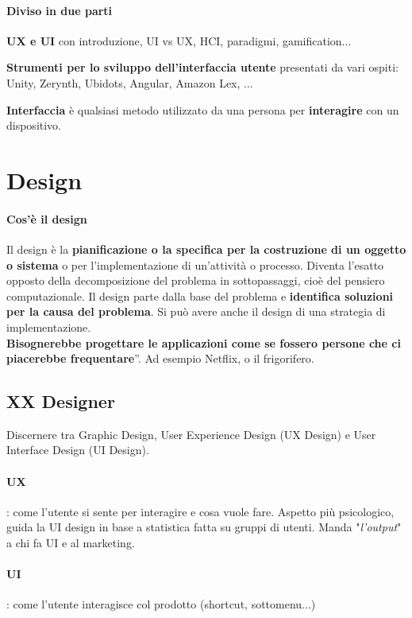 \documentclass[10pt]{article}
\begin{document}
\paragraph{Diviso in due parti}
\begin{list}{-}{}
\item \textbf{UX e UI} con introduzione, UI vs UX, HCI, paradigmi, gamification...
\item \textbf{Strumenti per lo sviluppo dell'interfaccia utente} presentati da vari ospiti: Unity, Zerynth, Ubidots, Angular, Amazon Lex, ...
\end{list}

\textbf{Interfaccia} è qualsiasi metodo utilizzato da una persona per \textbf{interagire} con un dispositivo.

\section{Design}
\paragraph{Cos'è il design} Il design è la \textbf{pianificazione o la specifica per la costruzione di un oggetto o sistema} o per l'implementazione di un'attività o processo. Diventa l'esatto opposto della decomposizione del problema in sottopassaggi, cioè del pensiero computazionale. Il design parte dalla base del problema e \textbf{identifica soluzioni per la causa del problema}. Si può avere anche il design di una strategia di implementazione.\\
\quotedblbase \textbf{Bisognerebbe progettare le applicazioni come se fossero persone che ci piacerebbe frequentare}\textquotedblright. Ad esempio Netflix, o il frigorifero.

\subsection{XX Designer}
Discernere tra Graphic Design, User Experience Design (UX Design) e User Interface Design (UI Design).
\paragraph{UX}: come l'utente si sente per interagire e cosa vuole fare. Aspetto più psicologico, guida la UI design in base a statistica fatta su gruppi di utenti. Manda "\textit{l'output}" a chi fa UI e al marketing.\\
\paragraph{UI}: come l'utente interagisce col prodotto (shortcut, sottomenu...)\\
\end{document}
